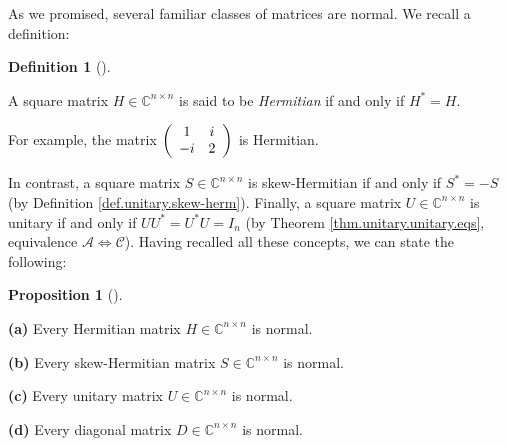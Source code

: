 \documentclass[numbers=enddot,12pt,final,onecolumn,notitlepage]{scrartcl}%
\numberwithin{exer}{subsection}
\theoremstyle{definition}
\newtheorem{prop}[theo]{Proposition}
\newenvironment{proposition}[1][]
{\begin{prop}[#1]\begin{leftbar}}
{\end{leftbar}\end{prop}}
\newtheorem{defi}[theo]{Definition}
\newenvironment{definition}[1][]
{\begin{defi}[#1]\begin{leftbar}}
{\end{leftbar}\end{defi}}
\begin{document}
As we promised, several familiar classes of matrices are normal. We recall a definition:

\begin{definition}
\label{def.schurtri.herm}A square matrix $H\in\mathbb{C}^{n\times n}$ is said
to be \emph{Hermitian} if and only if $H^{\ast}=H$.
\end{definition}

For example, the matrix $\left(
\begin{array}
[c]{cc}%
1 & i\\
-i & 2
\end{array}
\right)  $ is Hermitian.

In contrast, a square matrix $S\in\mathbb{C}^{n\times n}$ is skew-Hermitian if
and only if $S^{\ast}=-S$ (by Definition \ref{def.unitary.skew-herm}).
Finally, a square matrix $U\in\mathbb{C}^{n\times n}$ is unitary if and only
if $UU^{\ast}=U^{\ast}U=I_{n}$ (by Theorem \ref{thm.unitary.unitary.eqs},
equivalence $\mathcal{A}\Longleftrightarrow\mathcal{C}$). Having recalled all
these concepts, we can state the following:

\begin{proposition}
\label{prop.schurtri.normal.classes}\textbf{(a)} Every Hermitian matrix
$H\in\mathbb{C}^{n\times n}$ is normal.

\textbf{(b)} Every skew-Hermitian matrix $S\in\mathbb{C}^{n\times n}$ is normal.

\textbf{(c)} Every unitary matrix $U\in\mathbb{C}^{n\times n}$ is normal.

\textbf{(d)} Every diagonal matrix $D\in\mathbb{C}^{n\times n}$ is normal.
\end{proposition}
\end{document}
